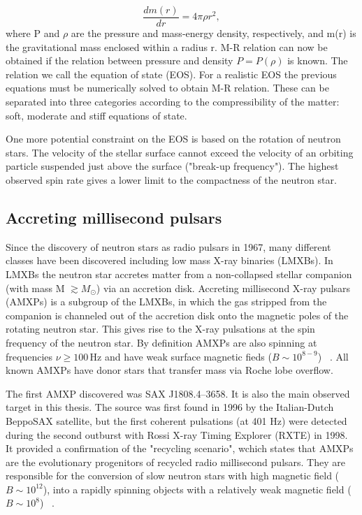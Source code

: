 \documentclass{wihuri}
\begin{document}
\begin{equation}
 \frac{dm(r)}{dr} = 4 \pi \rho r^{2},
 \end{equation}
where P and $\rho$ are the pressure and mass-energy density, respectively, and m(r) is the gravitational mass enclosed within a radius r. M-R relation can now be obtained if the relation between pressure and density $P=P(\rho)$ is known. The relation we call the equation of state (EOS). For a realistic EOS the previous equations must be numerically solved to obtain M-R relation. These can be separated into three categories according to the compressibility of the matter: soft, moderate and stiff equations of state.




One more potential constraint on the EOS is based on the rotation of neutron stars. The velocity of the stellar surface cannot exceed the velocity of an orbiting particle suspended just above the surface ("break-up frequency"). The highest observed spin rate gives a lower limit to the compactness of the neutron star.


\subsection{Accreting millisecond pulsars}




Since the discovery of neutron stars as radio pulsars
in 1967, many different classes have been discovered including low mass X-ray binaries (LMXBs). In LMXBs the neutron star accretes matter from a non-collapsed stellar companion (with mass M $\gtrsim  M_{\odot}$) via an accretion disk. Accreting millisecond X-ray pulsars (AMXPs) is a subgroup of the LMXBs, in which the gas stripped from the companion is channeled out of the accretion disk onto the magnetic poles of the rotating neutron star. This gives rise to the X-ray pulsations at the spin frequency of the neutron star. By definition AMXPs are also spinning at frequencies $\nu \ge 100 \, \mathrm{Hz}$ and have weak surface magnetic fieds ($B \sim 10^{8-9}$) ~\cite{patruno}. All known AMXPs have donor stars that transfer mass via Roche lobe overflow. 



The first AMXP discovered was SAX J1808.4–3658. It is also the main observed target in this thesis. The source was first found in 1996 by the Italian-Dutch BeppoSAX satellite, but the first coherent pulsations (at 401 Hz) were detected during the second outburst with Rossi X-ray Timing Explorer (RXTE) in 1998.  It provided a confirmation of the "recycling scenario", wchich states that AMXPs are the evolutionary progenitors of recycled radio millisecond pulsars. They are responsible for the conversion of slow neutron stars with high magnetic field ($B \sim 10^{12}$), into a rapidly spinning objects with a relatively weak magnetic field ($B \sim 10^{8}$) ~\cite{patruno}. 
\end{document}
